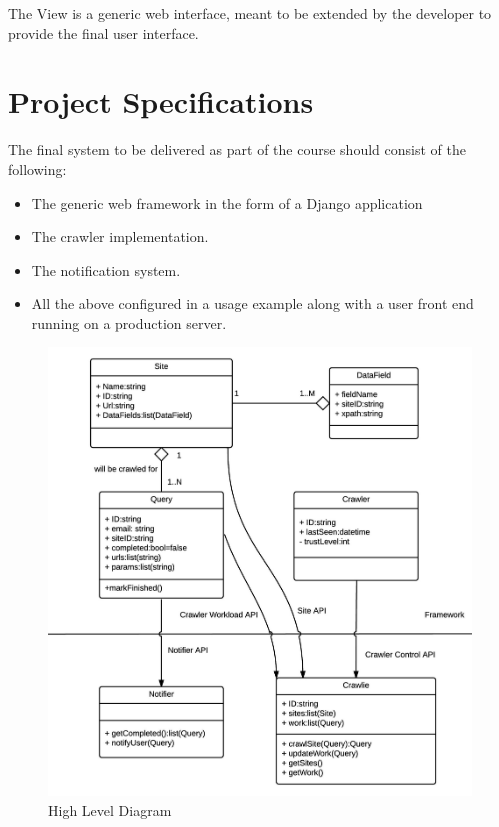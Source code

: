 \documentclass[a4paper,10pt]{article} \usepackage{anysize}
\begin{document}
    The View is a generic web interface, meant to be extended by the developer
    to provide the final user interface.

\section{Project Specifications}
    The final system to be delivered as part of the course should consist of
    the following:
    \begin{itemize}
            \item The generic web framework in the form of a Django application
            \item The crawler implementation.
            \item The notification system.
            \item All the above configured in a usage example along with a user
                front end running on a production server.
    \end{itemize}

    \begin{figure}[h]
        \includegraphics[width=\textwidth]{files/high_level_diagram.png}
        \caption{High Level Diagram}
    \end{figure}
\end{document}
